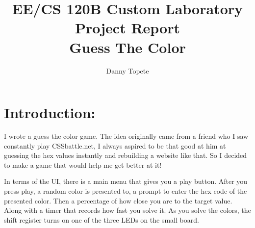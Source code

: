 \documentclass[12pt]{article}
\begin{document}

\title{EE/CS 120B Custom Laboratory Project Report\\
Guess The Color}
\author{Danny Topete}

\maketitle

\doublespacing

\section{Introduction:}
I wrote a guess the color game. The idea originally came from a friend who I saw constantly play CSSbattle.net,
I always aspired to be that good at him at guessing the hex values instantly and rebuilding a website like that.
So I decided to make a game that would help me get better at it!

In terms of the UI, there is a main menu that gives you a play button. After you press play,
a random color is presented to, a prompt to enter the
hex code of the presented color. Then a percentage
of how close you are to the target value. Along with
a timer that records how fast you solve it.
As you solve the colors, the shift register turns on one of the
three LEDs on the small board.
\pagebreak
\end{document}

